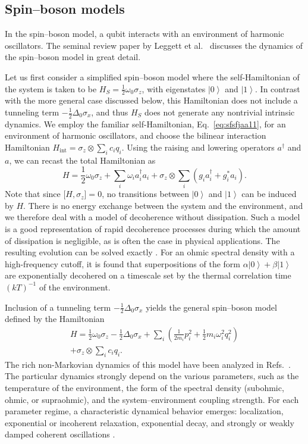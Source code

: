 \documentclass[aps,pra,reprint,amsmath,amssymb,showpacs,nofootinbib,floatfix,onecolumn,12pt]{revtex4-1}
\newcommand{\ket}[1]{\left\vert{#1}\right\rangle}
\begin{document}
\subsection{\label{sec:spin-boson-models}Spin--boson models}

In the spin--boson model, a qubit interacts with an environment of harmonic oscillators. The seminal review paper by Leggett et al.\ \cite{Leggett:1987:pm} discusses the dynamics of the spin--boson model in great detail. 

Let us first consider a simplified spin--boson model where the  self-Hamiltonian of the system is taken to be  $H_S = \frac{1}{2} \omega_0 \sigma_z$, with eigenstates $\ket{0}$ and $\ket{1}$. In contrast with the more general case discussed below, this Hamiltonian does not include a tunneling term $-\frac{1}{2} \Delta_0 \sigma_x$, and thus $H_S$ does not generate any nontrivial intrinsic dynamics. We employ the familiar self-Hamiltonian, Eq.~\eqref{eq:sfsfjaa11}, for an environment of harmonic oscillators, and choose the bilinear interaction Hamiltonian $H_\text{int} =   \sigma_z \otimes \sum_i c_i q_i$. Using the raising and lowering operators $a^\dagger$ and $a$, we can recast the total Hamiltonian as
%
\begin{equation}\label{eq:h-ssb}
  H =  \frac{1}{2} \omega_0 \sigma_z 
  + \sum_i \omega_i a_i^\dagger a_i + \sigma_z \otimes  \sum_i 
  \left( g_ia_i^\dagger + g_i^* a_i \right).
\end{equation}
%
Note that since $\bigl[ H, \sigma_z \bigr] = 0$, no transitions between $\ket{0}$ and $\ket{1}$ can be induced by $H$. There is no energy exchange between the system and the environment, and we therefore deal with a model of decoherence without dissipation. Such a model is a good representation of rapid decoherence processes during which the amount of dissipation is negligible, as is often the case in physical applications. The resulting evolution can be solved exactly \cite{Schlosshauer:2007:un}. For an ohmic spectral density with a high-frequency cutoff, it is found that superpositions of the form $\alpha\ket{0}+\beta\ket{1}$ are exponentially decohered on a timescale set by the thermal correlation time $(kT)^{-1}$ of the environment.

Inclusion of a tunneling term $-\frac{1}{2} \Delta_0 \sigma_x$ yields the general spin--boson model defined by the
Hamiltonian
%
\begin{multline}\label{eq:h-sbhdcskgsf}
H = \frac{1}{2} \omega_0 \sigma_z - 
\frac{1}{2} \Delta_0 \sigma_x 
+  \sum_i \left( \frac{1}{2m_i} p_i^2 + \frac{1}{2} m_i \omega_i^2 q_i^2 
   \right) \\+ \sigma_z \otimes \sum_i
  c_i q_i.
\end{multline}
%
The rich non-Markovian dynamics of this model have been analyzed in Refs.~\cite{Leggett:1987:pm,Weiss:1999:tv}. The particular dynamics strongly depend on the various parameters, such as the temperature of the environment, the form of the spectral density (subohmic, ohmic, or supraohmic), and the system--environment coupling strength. For each parameter regime, a characteristic dynamical behavior emerges: localization, exponential or incoherent relaxation, exponential decay, and strongly or weakly damped coherent oscillations \cite{Leggett:1987:pm}.
\end{document}
